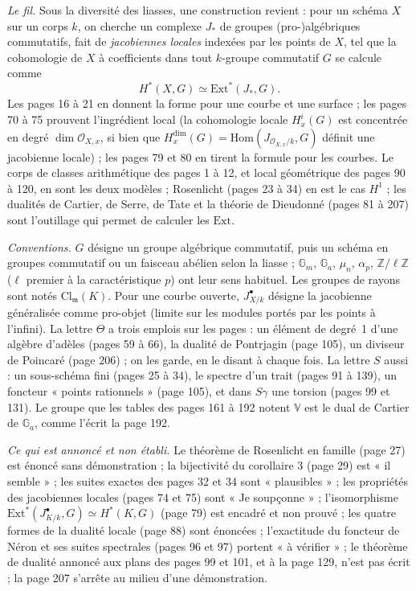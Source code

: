 \documentclass[11pt,a4paper]{article}
\begin{document}
\emph{Le fil.} Sous la diversité des liasses, une construction revient : pour un
schéma $X$ sur un corps $k$, on cherche un complexe $J_*$ de groupes
(pro-)algébriques commutatifs, fait de \emph{jacobiennes locales} indexées par
les points de $X$, tel que la cohomologie de $X$ à coefficients dans tout
$k$-groupe commutatif $G$ se calcule comme
\[
H^*(X, G) \simeq \mathrm{Ext}^*(J_*, G).
\]
Les pages 16 à 21 en donnent la forme pour une courbe et une surface ; les pages
70 à 75 prouvent l'ingrédient local (la cohomologie locale $H^i_x(G)$ est
concentrée en degré $\dim \mathcal{O}_{X,x}$, si bien que $H^{\dim}_x(G) =
\mathrm{Hom}(J_{\mathcal{O}_{X,x}/k}, G)$ définit une jacobienne locale) ; les
pages 79 et 80 en tirent la formule pour les courbes. Le corps de classes
arithmétique des pages 1 à 12, et local géométrique des pages 90 à 120, en sont
les deux modèles ; Rosenlicht (pages 23 à 34) en est le cas $H^1$ ; les
dualités de Cartier, de Serre, de Tate et la théorie de Dieudonné (pages 81 à
207) sont l'outillage qui permet de calculer les $\mathrm{Ext}$.

\emph{Conventions.} $G$ désigne un groupe algébrique commutatif, puis un schéma
en groupes commutatif ou un faisceau abélien selon la liasse ; $\mathbb{G}_m$,
$\mathbb{G}_a$, $\mu_n$, $\alpha_p$, $\mathbb{Z}/\ell\mathbb{Z}$ ($\ell$ premier
à la caractéristique $p$) ont leur sens habituel. Les groupes de rayons sont
notés $\mathrm{Cl}_{\mathfrak{m}}(K)$. Pour une courbe ouverte, $J^{\bullet}_{X/k}$
désigne la jacobienne généralisée comme pro-objet (limite sur les modules
portés par les points à l'infini). La lettre $\Theta$ a trois emplois sur les
pages : un élément de degré~1 d'une algèbre d'adèles (pages 59 à 66), la dualité
de Pontrjagin (page 105), un diviseur de Poincaré (page 206) ; on les garde, en
le disant à chaque fois. La lettre $S$ aussi : un sous-schéma fini (pages 25 à
34), le spectre d'un trait (pages 91 à 139), un foncteur « points rationnels »
(page 105), et dans $S\gamma$ une torsion (pages 99 et 131). Le groupe que les
tables des pages 161 à 192 notent $\mathbb{V}$ est le dual de Cartier de
$\mathbb{G}_a$, comme l'écrit la page 192.

\emph{Ce qui est annoncé et non établi.} Le théorème de Rosenlicht en famille
(page 27) est énoncé sans démonstration ; la bijectivité du corollaire 3
(page 29) est « il semble » ; les suites exactes des pages 32 et 34 sont
« plausibles » ; les propriétés des jacobiennes locales (pages 74 et 75) sont
« Je soupçonne » ; l'isomorphisme $\mathrm{Ext}^*(J^{\bullet}_{K/k}, G) \simeq
H^*(K, G)$ (page 79) est encadré et non prouvé ; les quatre formes de la
dualité locale (page 88) sont énoncées ; l'exactitude du foncteur de Néron et
ses suites spectrales (pages 96 et 97) portent « à vérifier » ; le théorème de
dualité annoncé aux plans des pages 99 et 101, et à la page 129, n'est pas
écrit ; la page 207 s'arrête au milieu d'une démonstration.
\end{document}
